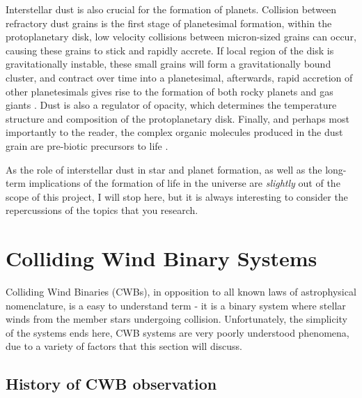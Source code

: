 Interstellar dust is also crucial for the formation of planets.
Collision between refractory dust grains is the first stage of planetesimal formation, within the protoplanetary disk, low velocity collisions between micron-sized grains can occur, causing these grains to stick and rapidly accrete.
If local region of the disk is gravitationally instable, these small grains will form a gravitationally bound cluster, and contract over time into a planetesimal, afterwards, rapid accretion of other planetesimals gives rise to the formation of both rocky planets and gas giants
\parencite{apaiProtoplanetaryDustAstrophysical2010}.
Dust is also a regulator of opacity, which determines the temperature structure and composition of the protoplanetary disk.
Finally, and perhaps most importantly to the reader, the complex organic molecules produced in the dust grain are pre-biotic precursors to life
\parencite{birnstielDustEvolutionFormation2016}.

As the role of interstellar dust in star and planet formation, as well as the long-term implications of the formation of life in the universe are \textit{slightly} out of the scope of this project, I will stop here, but it is always interesting to consider the repercussions of the topics that you research.

\section{Colliding Wind Binary Systems}
\label{sec:cwb}

Colliding Wind Binaries (CWBs), in opposition to all known laws of astrophysical nomenclature, is a easy to understand term - it is a binary system where stellar winds from the member stars undergoing collision.
Unfortunately, the simplicity of the systems ends here, CWB systems are very poorly understood phenomena, due to a variety of factors that this section will discuss.

\subsection{History of CWB observation}


